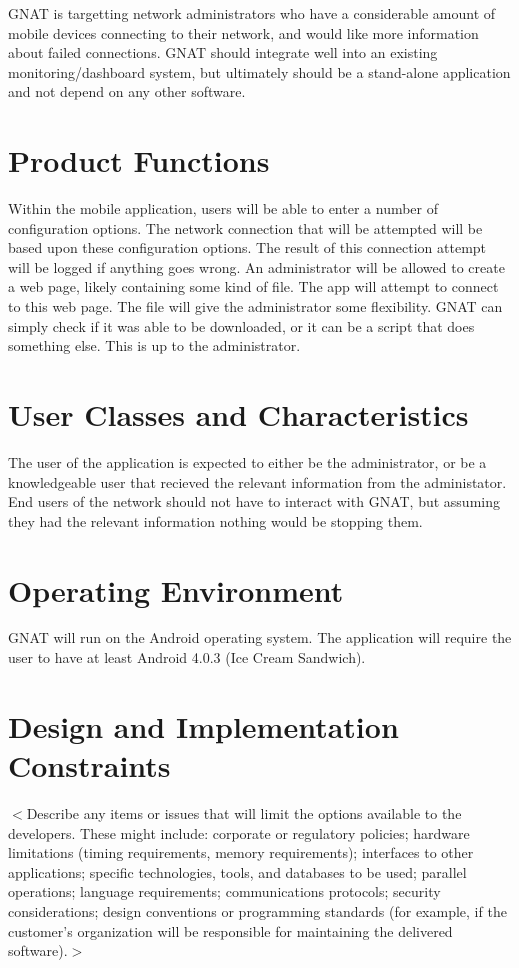 \documentclass{scrreprt}
\begin{document}
GNAT is targetting network administrators who have a considerable amount of mobile devices connecting to their network, and would like more information about failed connections.  GNAT should integrate well into an existing monitoring/dashboard system, but ultimately should be a stand-alone application and not depend on any other software.


\section{Product Functions}

Within the mobile application, users will be able to enter a number of configuration options.  The network connection that will be attempted will be based upon these configuration options.  The result of this connection attempt will be logged if anything goes wrong. An administrator will be allowed to create a web page, likely containing some kind of file.  The app will attempt to connect to this web page.  The file will give the administrator some flexibility. GNAT can simply check if it was able to be downloaded, or it can be a script that does something else.  This is up to the administrator.

\section{User Classes and Characteristics}
The user of the application is expected to either be the administrator, or be a knowledgeable user that recieved the relevant information from the administator.  End users of the network should not have to interact with GNAT, but assuming they had the relevant information nothing would be stopping them.

\section{Operating Environment}
GNAT will run on the Android operating system.  The application will require the user to have at least Android 4.0.3 (Ice Cream Sandwich).

\section{Design and Implementation Constraints}
$<$Describe any items or issues that will limit the options available to the 
developers. These might include: corporate or regulatory policies; hardware 
limitations (timing requirements, memory requirements); interfaces to other 
applications; specific technologies, tools, and databases to be used; parallel 
operations; language requirements; communications protocols; security 
considerations; design conventions or programming standards (for example, if the 
customer’s organization will be responsible for maintaining the delivered 
software).$>$
\end{document}
